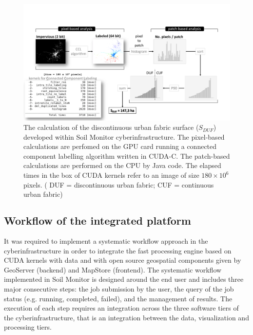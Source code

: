 \documentclass[APA,LATO1COL,doublespace]{WileyNJD-v2}
\begin{document}
\begin{figure}[t] %
    \centerline{\includegraphics[width=500pt]{Figure03.pdf}}
    \caption{ The calculation of the discontinuous urban fabric surface ($S_{DUF}$) developed within Soil Monitor cyberinfrastructure. 
    The pixel-based calculations are perfomed on the GPU card running a connected component labelling algorithm written in CUDA-C. 
    The patch-based calculations are performed on the CPU by Java code.
    The elapsed times in the box of CUDA kernels  refer to an image of size $180 \times 10^6$ pixels.
    ( DUF = discontinuous urban fabric; CUF = continuous urban fabric)} \label{fig:ccl}
\end{figure}


\subsection{Workflow of the integrated platform}
It was required to implement a systematic workflow approach in the cyberinfrastructure in order to integrate the fast processing engine based on CUDA kernels with data and with open source geospatial components given by GeoServer (backend) and MapStore (frontend). 
The systematic workflow implemented in Soil Monitor is designed around the end user and includes three major consecutive steps: the job submission by the user, the query of the job status (e.g. running, completed, failed), and the management of results.
The execution of each step requires an integration across the three software tiers of the cyberinfrastructure, that is an integration between the data, visualization and processing tiers. 
\end{document}
